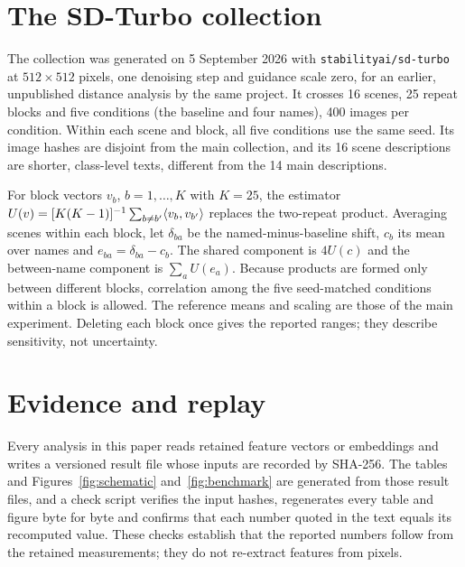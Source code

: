 \FloatBarrier
\section{The SD-Turbo collection}\label{app:sdturbo}

The collection was generated on 5 September 2026 with \texttt{stabilityai/sd-turbo} at
$512\times512$ pixels, one denoising step and guidance scale zero, for an earlier, unpublished
distance analysis by the same project. It crosses 16 scenes, 25 repeat blocks and five
conditions (the baseline and four names), 400 images per condition. Within each scene and
block, all five conditions use the same seed. Its image hashes are disjoint from the main
collection, and its 16 scene descriptions are shorter, class-level texts, different from the 14
main descriptions.

For block vectors $v_b$, $b=1,\dots,K$ with $K=25$, the estimator
$U(v)=[K(K-1)]^{-1}\sum_{b\ne b'}\langle v_b,v_{b'}\rangle$ replaces the two-repeat product. Averaging
scenes within each block, let $\delta_{ba}$ be the named-minus-baseline shift, $c_b$ its mean
over names and $e_{ba}=\delta_{ba}-c_b$. The shared component is $4U(c)$ and the between-name
component is $\sum_aU(e_a)$. Because products are formed only between different blocks,
correlation among the five seed-matched conditions within a block is allowed. The reference
means and scaling are those of the main experiment. Deleting each block once gives the reported
ranges; they describe sensitivity, not uncertainty.

\FloatBarrier
\section{Evidence and replay}\label{app:replay}

Every analysis in this paper reads retained feature vectors or embeddings and writes a versioned
result file whose inputs are recorded by SHA-256. The tables and Figures~\ref{fig:schematic}
and~\ref{fig:benchmark} are generated from those result files, and a check script verifies the
input hashes, regenerates every table and figure byte for byte and confirms that each number
quoted in the text equals its recomputed value. These checks establish that the reported numbers
follow from the retained measurements; they do not re-extract features from pixels.

